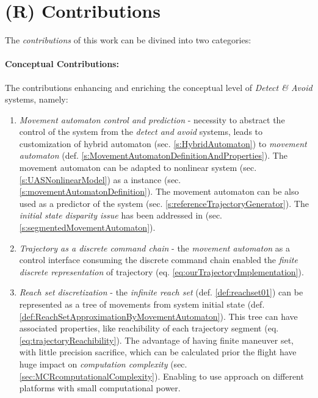 \section{(R) Contributions}\label{s:Contributions} 
\noindent The \emph{contributions} of this work can be divined into two categories:
    
\paragraph{Conceptual Contributions:} The contributions enhancing and enriching the conceptual level of \emph{Detect \& Avoid} systems, namely:

\begin{enumerate}
    \item \emph{Movement automaton control and prediction} -  necessity to abstract the control of the system from the \emph{detect and avoid} systems, leads to customization of hybrid automaton (sec. \ref{s:HybridAutomaton}) to \emph{movement automaton} (def. \ref{s:MovementAutomatonDefinitionAndProperties}). The movement automaton can be adapted to nonlinear system (sec. \ref{s:UASNonlinearModel}) as a instance (sec. \ref{s:movementAutomatonDefinition}). The movement automaton can be also used as a predictor of the system (sec. \ref{s:referenceTrajectoryGenerator}). The \emph{initial state disparity issue} \cite{gomola2017obstacle} has been addressed in (sec. \ref{s:segmentedMovementAutomaton}).
    
    \item \emph{Trajectory as a discrete command chain} -  the \emph{movement automaton} as a control interface consuming the discrete command chain enabled the \emph{finite discrete representation} of trajectory (eq. \ref{eq:ourTrajectoryImplementation}).
    
    \item \emph{Reach set discretization} - the \emph{infinite reach set} (def. \ref{def:reachset01}) can be represented as a tree of movements from system initial state (def. \ref{def:ReachSetApproximationByMovementAutomaton}). This tree can have associated properties, like reachibility of each trajectory segment (eq. \ref{eq:trajectoryReachibility}).  The advantage of having finite maneuver set, with little precision sacrifice, which can be calculated prior the flight have huge impact on \emph{computation complexity} (sec. \ref{sec:MCRcomputationalComplexity}). Enabling to use approach on different platforms with small computational power. 
    

\end{enumerate}
